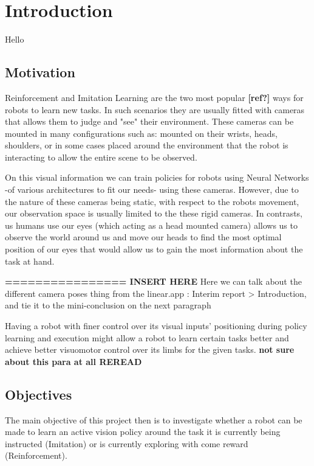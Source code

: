 \chapter{Introduction}
Hello \cite{greenwade93}
\section{Motivation}
    Reinforcement and Imitation Learning are the two most popular \textbf{[ref?]} ways for robots to learn new tasks. In such scenarios they are usually fitted with cameras that allows them to judge and "see" their environment. These cameras can be mounted in many configurations such as: mounted on their wrists, heads, shoulders, or in some cases placed around the environment that the robot is interacting to allow the entire scene to be observed.


    On this visual information we can train policies for robots using Neural Networks -of various architectures to fit our needs- using these cameras. However, due to the nature of these cameras being static, with respect to the robots movement, our observation space is usually limited to the these rigid cameras. In contrasts, us humans use our eyes (which acting as a head mounted camera) allows us to observe the world around us and move our heads to find the most optimal position of our eyes that would allow us to gain the most information about the task at hand. 

    \textbf{================ INSERT HERE} Here we can talk about the different camera poses thing from the linear.app : Interim report > Introduction, and tie it to the mini-conclusion on the next paragraph

    Having a robot with finer control over its visual inputs' positioning during policy learning and execution might allow a robot to learn certain tasks better and achieve better visuomotor control over its limbs for the given tasks. \textbf{not sure about this para at all REREAD} 

        
\section{Objectives}
    The main objective of this project then is to investigate whether a robot can be made to learn an active vision policy around the task it is currently being instructed (Imitation) or is currently exploring with come reward (Reinforcement).

